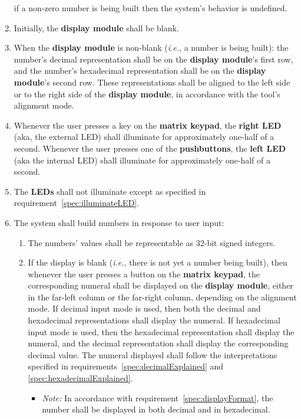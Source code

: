 \begin{enumerate}
        if a non-zero number is being built then the system's behavior is undefined.
    \item Initially, the \textbf{display module} shall be blank.
    \item \label{spec:displayFormat} When the \textbf{display module} is non-blank (\textit{i.e.}, a number is being built):
        the number's decimal representation shall be on the \textbf{display module}'s first row,
        and the number's hexadecimal representation shall be on the \textbf{display module}'s second row.
        These representations shall be aligned to the left side or to the right side of the \textbf{display module}, in accordance with the tool's alignment mode.
    \item \label{spec:illuminateLED} Whenever the user presses a key on the \textbf{matrix keypad}, the \textbf{right LED} (aka, the external LED) shall illuminate for approximately one-half of a second.
        Whenever the user presses one of the \textbf{pushbuttons}, the \textbf{left LED} (aka the internal LED) shall illuminate for approximately one-half of a second.
    \item \label{spec:LEDoffWhenOtherwise} The \textbf{LEDs} shall not illuminate except as specified in requirement~\ref{spec:illuminateLED}.
    \item The system shall build numbers in response to user input:
        \begin{enumerate}
        \item \label{spec:32bits} The numbers' values shall be representable as 32-bit signed integers.
        \item \label{spec:initialKeyPress} If the display is blank (\textit{i.e.}, there is not yet a number being built), then whenever the user presses a button on the \textbf{matrix keypad}, the corresponding numeral shall be displayed on the \textbf{display module}, either in the far-left column or the far-right column, depending on the alignment mode.
            If decimal input mode is used, then both the decimal and hexadecimal representations shall display the numeral.
            If hexadecimal input mode is used, then the hexadecimal representation shall display the numeral,
            and the decimal representation shall display the corresponding decimal value.
            The numeral displayed shall follow the interpretations specified in requirements~\ref{spec:decimalExplained} and \ref{spec:hexadecimalExplained}.
            \begin{itemize}
                \item \textit{Note:} In accordance with requirement~\ref{spec:displayFormat}, the number shall be displayed in both decimal and in hexadecimal.

\end{itemize}
\end{enumerate}
\end{enumerate}
